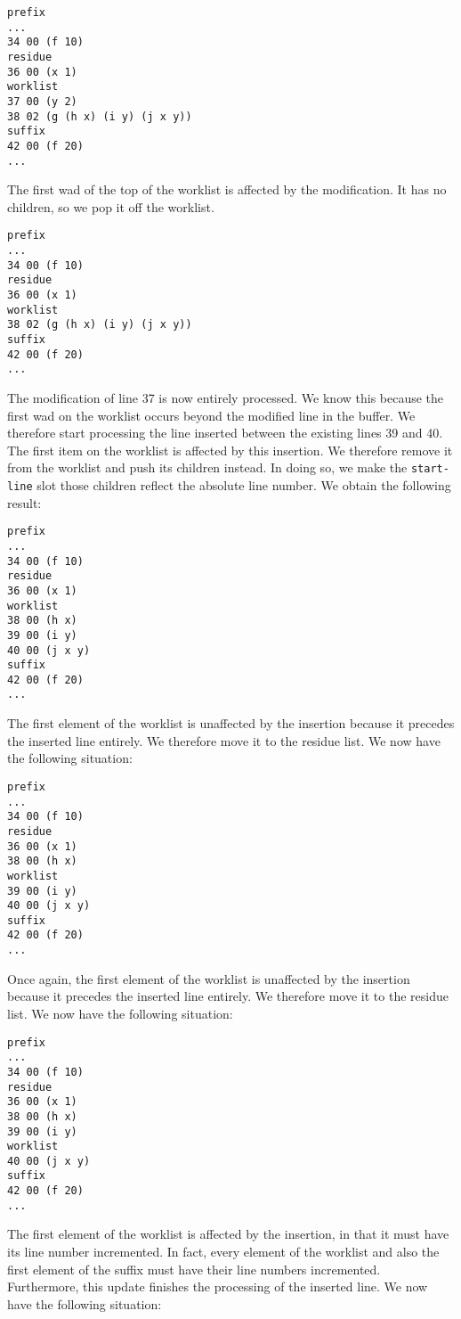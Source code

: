 \begin{verbatim}
prefix
...
34 00 (f 10)
residue
36 00 (x 1)
worklist
37 00 (y 2)
38 02 (g (h x) (i y) (j x y))
suffix
42 00 (f 20)
...
\end{verbatim}

The first wad of the top of the worklist is affected by the
modification.  It has no children, so we pop it off the worklist.

\begin{verbatim}
prefix
...
34 00 (f 10)
residue
36 00 (x 1)
worklist
38 02 (g (h x) (i y) (j x y))
suffix
42 00 (f 20)
...
\end{verbatim}

The modification of line 37 is now entirely processed.  We know this
because the first wad on the worklist occurs beyond the
modified line in the buffer.  We therefore start processing the line
inserted between the existing lines 39 and 40.  The first item on the
worklist is affected by this insertion.  We therefore remove it from
the worklist and push its children instead.  In doing so, we make the
\texttt{start-line} slot those children reflect the absolute line
number.  We obtain the following result:

\begin{verbatim}
prefix
...
34 00 (f 10)
residue
36 00 (x 1)
worklist
38 00 (h x)
39 00 (i y)
40 00 (j x y)
suffix
42 00 (f 20)
...
\end{verbatim}

The first element of the worklist is unaffected by the insertion
because it precedes the inserted line entirely.  We therefore move it
to the residue list.  We now have the following situation:

\begin{verbatim}
prefix
...
34 00 (f 10)
residue
36 00 (x 1)
38 00 (h x)
worklist
39 00 (i y)
40 00 (j x y)
suffix
42 00 (f 20)
...
\end{verbatim}

Once again, the first element of the worklist is unaffected by the
insertion because it precedes the inserted line entirely.  We
therefore move it to the residue list.  We now have the following
situation:

\begin{verbatim}
prefix
...
34 00 (f 10)
residue
36 00 (x 1)
38 00 (h x)
39 00 (i y)
worklist
40 00 (j x y)
suffix
42 00 (f 20)
...
\end{verbatim}

The first element of the worklist is affected by the insertion, in
that it must have its line number incremented.  In fact, every element
of the worklist and also the first element of the suffix must have
their line numbers incremented.  Furthermore, this update finishes the
processing of the inserted line.  We now have the following situation:

